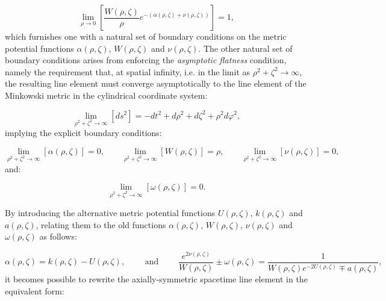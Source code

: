 \documentclass{article}
\begin{document}
\begin{equation}
\lim_{\rho \to 0} \left[ \frac{W \left( \rho, \zeta \right)}{\rho} e^{- \left( \alpha \left( \rho, \zeta \right) + \nu \left( \rho, \zeta \right) \right)} \right] = 1,
\end{equation}
which furnishes one with a natural set of boundary conditions on the metric potential functions ${\alpha \left( \rho, \zeta \right)}$, ${W \left( \rho, \zeta \right)}$ and ${\nu \left( \rho, \zeta \right)}$. The other natural set of boundary conditions arises from enforcing the \textit{asymptotic flatness} condition, namely the requirement that, at spatial infinity, i.e. in the limit as ${\rho^2 + \zeta^2 \to \infty}$, the resulting line element must converge asymptotically to the line element of the Minkowski metric in the cylindrical coordinate system:

\begin{equation}
\lim_{\rho^2 + \zeta^2 \to \infty} \left[ d s^2 \right] = -d t^2 + d \rho^2 + d \zeta^2 + \rho^2 d \varphi^2,
\end{equation}
implying the explicit boundary conditions:

\begin{equation}
\lim_{\rho^2 + \zeta^2 \to \infty} \left[ \alpha \left( \rho, \zeta \right) \right] = 0, \qquad \lim_{\rho^2 + \zeta^2 \to \infty} \left[ W \left( \rho, \zeta \right) \right] = \rho, \qquad \lim_{\rho^2 + \zeta^2 \to \infty} \left[ \nu \left( \rho, \zeta \right) \right] = 0,
\end{equation}
and:

\begin{equation}
\lim_{\rho^2 + \zeta^2 \to \infty} \left[ \omega \left( \rho, \zeta \right) \right] = 0.
\end{equation}

By introducing the alternative metric potential functions ${U \left( \rho, \zeta \right)}$, ${k \left( \rho, \zeta \right)}$ and ${a \left( \rho, \zeta \right)}$, relating them to the old functions ${\alpha \left( \rho, \zeta \right)}$, ${W \left( \rho, \zeta \right)}$, ${\nu \left( \rho, \zeta \right)}$ and ${\omega \left( \rho, \zeta \right)}$ as follows:

\begin{equation}
\alpha \left( \rho, \zeta \right) = k \left( \rho, \zeta \right) - U \left( \rho, \zeta \right), \qquad \text{ and } \qquad \frac{e^{2 \nu \left(\rho, \zeta \right)}}{W \left( \rho, \zeta \right)} \pm \omega \left( \rho, \zeta \right) = \frac{1}{W \left( \rho, \zeta \right) e^{-2 U \left( \rho, \zeta \right)} \mp a \left( \rho, \zeta \right)},
\end{equation}
it becomes possible to rewrite the axially-symmetric spacetime line element in the equivalent form:
\end{document}
